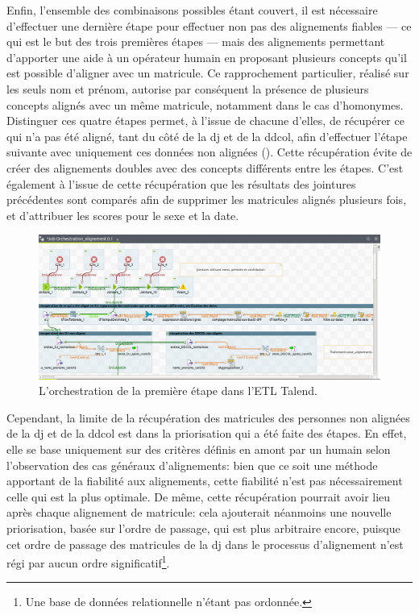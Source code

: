 \noindent Enfin, l'ensemble des combinaisons possibles étant couvert, il est nécessaire d'effectuer une dernière étape pour effectuer non pas des alignements fiables --- ce qui est le but des trois premières étapes --- mais des alignements permettant d'apporter une aide à un opérateur humain en proposant plusieurs concepts qu'il est possible d'aligner avec un matricule. Ce rapprochement particulier, réalisé sur les seuls nom et prénom, autorise par conséquent la présence de plusieurs concepts alignés avec un même matricule, notamment dans le cas d'homonymes.\\

Distinguer ces quatre étapes permet, à l'issue de chacune d'elles, de récupérer ce qui n'a pas été aligné, tant du côté de la \ac{dj} et de la \ac{ddcol}, afin d'effectuer l'étape suivante avec uniquement ces données non alignées (). Cette récupération évite de créer des alignements doubles avec des concepts différents entre les étapes. C'est également à l'issue de cette récupération que les résultats des jointures précédentes sont comparés afin de supprimer les matricules alignés plusieurs fois, et d'attribuer les scores pour le sexe et la date.\\
\begin{figure}[!h]
	\centering
	\includegraphics[width=16cm]{images/orchestration_partie1_dj.png}
	\caption{L'orchestration de la première étape dans l'ETL Talend.}
	\label{orchestration}
\end{figure}

Cependant, la limite de la récupération des matricules des personnes non alignées de la \ac{dj} et de la \ac{ddcol} est dans la priorisation qui a été faite des étapes. En effet, elle se base uniquement sur des critères définis en amont par un humain selon l'observation des cas généraux d'alignements: bien que ce soit une méthode apportant de la fiabilité aux alignements, cette fiabilité n'est pas nécessairement celle qui est la plus optimale. De même, cette récupération pourrait avoir lieu après chaque alignement de matricule: cela ajouterait néanmoins une nouvelle priorisation, basée sur l'ordre de passage, qui est plus arbitraire encore, puisque cet ordre de passage des matricules de la \ac{dj} dans le processus d'alignement n'est régi par aucun ordre significatif\footnote{Une base de données relationnelle n'étant pas ordonnée.}.

